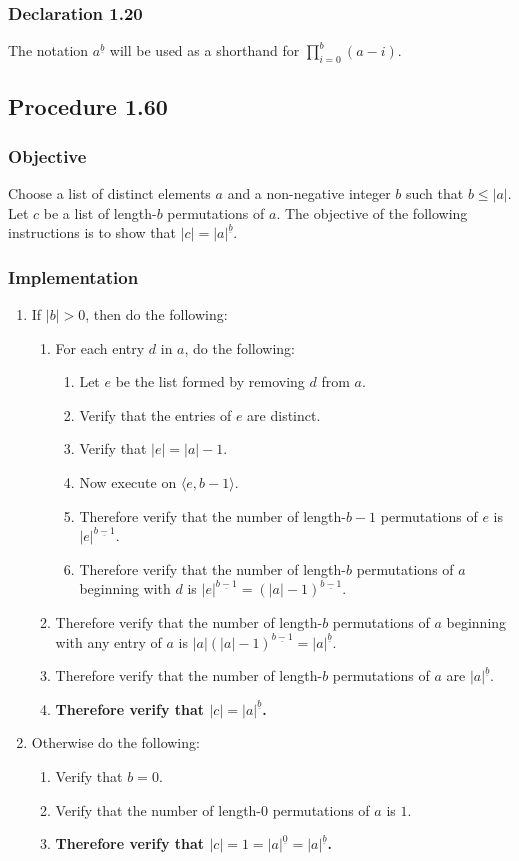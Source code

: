 \documentclass[twocolumn]{article}
\newcommand{\ul}[1]{\underline{#1}}
\newcommand{\declaration}[1]{\subsubsection*{Declaration #1}\label{sec:declaration #1}}
\newcommand{\procedure}[2][]{\subsection*{Procedure #2 \ifthenelse{\equal{#1}{}}{}{(#1)}}\label{sec:procedure #2}}
\newcommand{\objective}{\subsubsection*{Objective}}
\newcommand{\implementation}{\subsubsection*{Implementation}}
\newcommand{\procedurehr}[2][]{\hyperref[sec:procedure #2]{\ifthenelse{\equal{#1}{}}{procedure #2}{#1}}}
\begin{document}
		\declaration{1.20}
			The notation $a^{\ul{b}}$ will be used as a shorthand for $\prod_{i=0}^b(a-i)$.
		\procedure{1.60}
			\objective
				Choose a list of distinct elements $a$ and a non-negative integer $b$ such that $b\le\lvert a\rvert$. Let $c$ be a list of length-$b$ permutations of $a$. The objective of the following instructions is to show that $\lvert c\rvert=\lvert a\rvert^{\ul{b}}$.
			\implementation
				\begin{enumerate}
					\item If $\lvert b\rvert>0$, then do the following:
					\begin{enumerate}
						\item For each entry $d$ in $a$, do the following:
						\begin{enumerate}
							\item Let $e$ be the list formed by removing $d$ from $a$.
							\item Verify that the entries of $e$ are distinct.
							\item Verify that $\lvert e\rvert=\lvert a\rvert-1$.
							\item Now execute \procedurehr{1.60} on $\langle e,b-1\rangle$.
							\item Therefore verify that the number of length-$b-1$ permutations of $e$ is $\lvert e\rvert^{\ul{b-1}}$.
							\item Therefore verify that the number of length-$b$ permutations of $a$ beginning with $d$ is $\lvert e\rvert^{\ul{b-1}}=(\lvert a\rvert-1)^{\ul{b-1}}$.
						\end{enumerate}
						\item Therefore verify that the number of length-$b$ permutations of $a$ beginning with any entry of $a$ is $\lvert a\rvert(\lvert a\rvert-1)^{\ul{b-1}}=\lvert a\rvert^{\ul{b}}$.
						\item Therefore verify that the number of length-$b$ permutations of $a$ are $\lvert a\rvert^{\ul{b}}$.
						\item \textbf{Therefore verify that $\lvert c\rvert=\lvert a\rvert^{\ul{b}}$.}
					\end{enumerate}
					\item Otherwise do the following:
					\begin{enumerate}
						\item Verify that $b=0$.
						\item Verify that the number of length-$0$ permutations of $a$ is $1$.
						\item \textbf{Therefore verify that $\lvert c\rvert=1=\lvert a\rvert^{\ul{0}}=\lvert a\rvert^{\ul{b}}$.}
					\end{enumerate}
				\end{enumerate}
\end{document}
